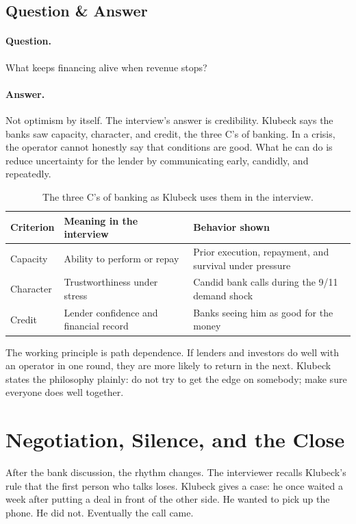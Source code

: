 \subsection{Question \& Answer}

\paragraph{Question.}
What keeps financing alive when revenue stops?

\paragraph{Answer.}
Not optimism by itself. The interview's answer is credibility. Klubeck says the banks saw capacity, character, and credit, the three C's of banking. In a crisis, the operator cannot honestly say that conditions are good. What he can do is reduce uncertainty for the lender by communicating early, candidly, and repeatedly.

\begin{table}
\centering
\begin{tabular}{p{.23\linewidth}p{.32\linewidth}p{.34\linewidth}}
\hline
Criterion & Meaning in the interview & Behavior shown \\
\hline
Capacity & Ability to perform or repay & Prior execution, repayment, and survival under pressure \\
Character & Trustworthiness under stress & Candid bank calls during the 9/11 demand shock \\
Credit & Lender confidence and financial record & Banks seeing him as good for the money \\
\hline
\end{tabular}
\caption{The three C's of banking as Klubeck uses them in the interview.}
\end{table}

The working principle is path dependence. If lenders and investors do well with an operator in one round, they are more likely to return in the next. Klubeck states the philosophy plainly: do not try to get the edge on somebody; make sure everyone does well together.

\section{Negotiation, Silence, and the Close}

After the bank discussion, the rhythm changes. The interviewer recalls Klubeck's rule that the first person who talks loses. Klubeck gives a case: he once waited a week after putting a deal in front of the other side. He wanted to pick up the phone. He did not. Eventually the call came.

